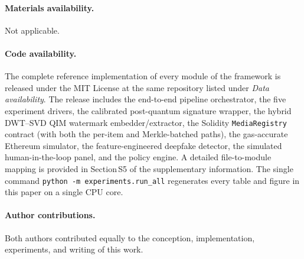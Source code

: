 \documentclass[11pt,a4paper]{article}
\theoremstyle{definition}
\theoremstyle{plain}
\theoremstyle{remark}
\begin{document}
\paragraph{Materials availability.} Not applicable.

\paragraph{Code availability.}
The complete reference implementation of every module of the
framework is released under the MIT License at the same repository
listed under \emph{Data availability}. The release includes the
end-to-end pipeline orchestrator, the five experiment drivers, the
calibrated post-quantum signature wrapper, the hybrid DWT--SVD QIM
watermark embedder/extractor, the Solidity \texttt{MediaRegistry}
contract (with both the per-item and Merkle-batched paths), the
gas-accurate Ethereum simulator, the feature-engineered deepfake
detector, the simulated human-in-the-loop panel, and the policy
engine. A detailed file-to-module mapping is provided in Section\,S5
of the supplementary information. The single command
\texttt{python -m experiments.run\_all} regenerates every table
and figure in this paper on a single CPU core.

\paragraph{Author contributions.}
Both authors contributed equally to the conception, implementation,
experiments, and writing of this work.



\end{document}
